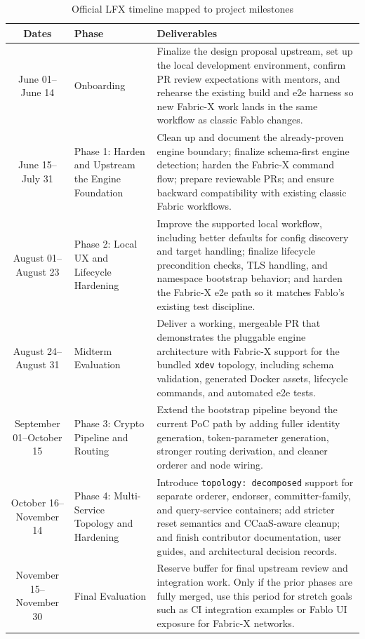 \begin{table}[h]
\centering
\begin{tabularx}{\textwidth}{|c|p{3.2cm}|X|}
\hline
\textbf{Dates} & \textbf{Phase} & \textbf{Deliverables} \\
\hline
June 01--June 14 & Onboarding & Finalize the design proposal upstream, set up the local development environment, confirm PR review expectations with mentors, and rehearse the existing build and e2e harness so new Fabric-X work lands in the same workflow as classic Fablo changes. \\
\hline
June 15--July 31 & Phase 1: Harden and Upstream the Engine Foundation & Clean up and document the already-proven engine boundary; finalize schema-first engine detection; harden the Fabric-X command flow; prepare reviewable PRs; and ensure backward compatibility with existing classic Fabric workflows. \\
\hline
August 01--August 23 & Phase 2: Local UX and Lifecycle Hardening & Improve the supported local workflow, including better defaults for config discovery and target handling; finalize lifecycle precondition checks, TLS handling, and namespace bootstrap behavior; and harden the Fabric-X e2e path so it matches Fablo's existing test discipline. \\
\hline
August 24--August 31 & Midterm Evaluation & Deliver a working, mergeable PR that demonstrates the pluggable engine architecture with Fabric-X support for the bundled \texttt{xdev} topology, including schema validation, generated Docker assets, lifecycle commands, and automated e2e tests. \\
\hline
September 01--October 15 & Phase 3: Crypto Pipeline and Routing & Extend the bootstrap pipeline beyond the current PoC path by adding fuller identity generation, token-parameter generation, stronger routing derivation, and cleaner orderer and node wiring. \\
\hline
October 16--November 14 & Phase 4: Multi-Service Topology and Hardening & Introduce \texttt{topology: decomposed} support for separate orderer, endorser, committer-family, and query-service containers; add stricter reset semantics and CCaaS-aware cleanup; and finish contributor documentation, user guides, and architectural decision records. \\
\hline
November 15--November 30 & Final Evaluation & Reserve buffer for final upstream review and integration work. Only if the prior phases are fully merged, use this period for stretch goals such as CI integration examples or Fablo UI exposure for Fabric-X networks. \\
\hline
\end{tabularx}
\caption{Official LFX timeline mapped to project milestones}
\label{tab:timeline}
\end{table}

